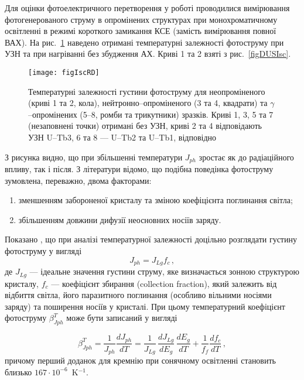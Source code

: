 Для оцінки фотоелектричного перетворення у роботі проводилися вимірювання фотогенерованого струму
в опромінених структурах
при монохроматичному освітленні в режимі короткого замикання КСЕ (замість вимірювання повної ВАХ).
На рис.~\ref{figIscRD} наведено отримані температурні залежності фотоструму
при УЗН та при нагріванні без збудження АХ.
Криві 1 та 2 взяті з рис.~\ref{figDUSIsc}.




\begin{figure}
\center
\texttt{[image: figIscRD]}
\caption{\label{figIscRD}
Температурні залежності густини фотоструму
для неопроміненого (криві 1 та 2, кола),
нейтронно--опроміненого (3 та 4, квадрати) та
$\gamma$--опромінених (5--8, ромби та трикутники)
зразків.
Криві 1, 3, 5 та 7 (незаповнені точки) отримані без УЗН,
криві 2 та 4 відповідають УЗН U--Tb3,
6 та 8 ---
U--Tb2 та U--Tb1, відповідно
}%
\end{figure}

З рисунка видно, що при збільшенні температури $J_{ph}$ зростає як до радіаційного впливу, так і після.
З літератури \cite{Faren,SCTemp:PP11,SCTemp:SEMSC140} відомо, що
подібна поведінка фотоструму зумовлена, переважно, двома факторами:
\begin{enumerate}[label=\arabic*),leftmargin=0em,itemindent=1.5em]
\item зменшенням забороненої кристалу та зміною коефіцієнта поглинання світла;
\item збільшенням довжини дифузії неосновних носіїв заряду.
\end{enumerate}
Показано \cite{SCTemp:PP11,SCTemp:SEMSC140}, що при аналізі температурної залежності доцільно
розглядати густину фотоструму у вигляді
\begin{equation}
\label{eqIscIdeal}
J_{ph}=J_{Lg}f_c\,,
\end{equation}
де
$J_{Lg}$ --- ідеальне значення густини струму, яке визначається
зонною структурою кристалу,
$f_c$ --- коефіцієнт збирання (collection fraction),
який залежить від відбиття світла, його паразитного поглинання (особливо вільними носіями заряду)
та поширення носіїв у кристалі.
При цьому температурний коефіцієнт фотоструму $\beta^T_{Jph}$ може бути записаний у вигляді

\begin{equation}
\label{eqIscTempKoef}
\beta^T_{Jph}=\frac{1}{J_{ph}}\frac{dJ_{ph}}{dT}=\frac{1}{J_{Lg}}\,\frac{dJ_{Lg}}{dE_g}\,\frac{dE_g}{dT}+\frac{1}{f_{f}}\frac{df_{c}}{dT}\,,
\end{equation}
причому перший доданок для кремнію при сонячному освітленні становить близько $167\cdot10^{-6}$~K$^{-1}$.



